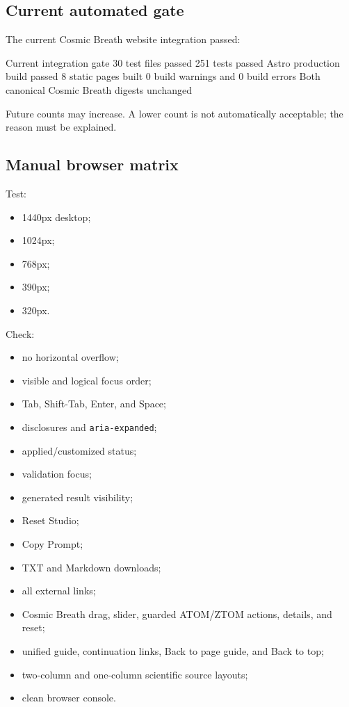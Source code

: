 \documentclass[11pt,letterpaper]{article}
\begin{document}
\subsection{Current automated gate}

The current Cosmic Breath website integration passed:

\begin{codebox}{Current integration gate}
30 test files passed
251 tests passed
Astro production build passed
8 static pages built
0 build warnings and 0 build errors
Both canonical Cosmic Breath digests unchanged
\end{codebox}

Future counts may increase. A lower count is not automatically acceptable; the
reason must be explained.

\subsection{Manual browser matrix}

Test:

\begin{itemize}
    \item 1440px desktop;
    \item 1024px;
    \item 768px;
    \item 390px;
    \item 320px.
\end{itemize}

Check:

\begin{itemize}
    \item no horizontal overflow;
    \item visible and logical focus order;
    \item Tab, Shift-Tab, Enter, and Space;
    \item disclosures and \texttt{aria-expanded};
    \item applied/customized status;
    \item validation focus;
    \item generated result visibility;
    \item Reset Studio;
    \item Copy Prompt;
    \item TXT and Markdown downloads;
    \item all external links;
    \item Cosmic Breath drag, slider, guarded ATOM/ZTOM actions, details, and reset;
    \item unified guide, continuation links, Back to page guide, and Back to top;
    \item two-column and one-column scientific source layouts;
    \item clean browser console.
\end{itemize}
\end{document}
